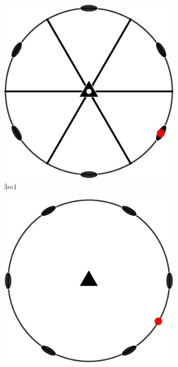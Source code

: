 \documentclass[compress]{beamer}
\begin{document}
\begin{frame}
\begin{figure}[H]
\begin{subfigure}{0.3\textwidth}
    \end{subfigure}
    \begin{subfigure}{0.3\textwidth}
      \includegraphics[width=\textwidth]{pic/sym-3m1}
      \caption{$\bar 3m1$}
    \end{subfigure}
    \begin{subfigure}{0.3\textwidth}
      \includegraphics[width=\textwidth]{pic/sym312}

\end{subfigure}
\end{figure}
\end{frame}
\end{document}
